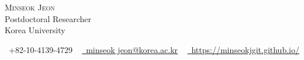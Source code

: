 \documentclass[letterpaper,11pt]{article}
\begin{document}

\begin{center}
    {\Huge \scshape Minseok Jeon} \\ \vspace{1pt}
    Postdoctoral Researcher\\\vspace{1pt}
    Korea University\\\vspace{1pt}
        
    \small \raisebox{-0.1\height}\faPhone\ +82-10-4139-4729 ~ \href{mailto:minseok_jeon@korea.ac.kr}{\raisebox{-0.2\height}\faEnvelope\  \underline{minseok$\_$jeon@korea.ac.kr}} ~ 
    \href{https://minseokjgit.github.io/}{\raisebox{-0.2\height}\faHome\ \underline{https://minseokjgit.github.io/}} 
    \vspace{-8pt}
\end{center}
\end{document}
